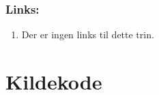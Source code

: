 \documentclass[10pt,a4paper,danish]{article}
\begin{document}
\subsubsection{Links:}
\begin{enumerate}
\item Der er ingen links til dette trin. 
\end{enumerate}

\section{Kildekode}

\end{document}
